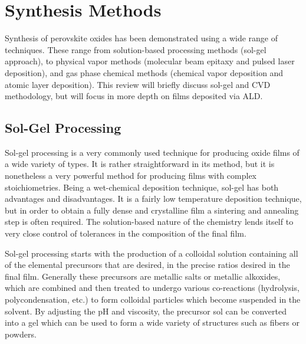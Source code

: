 \chapter{Synthesis Methods}
\label{chap:Synth}
\thispagestyle{empty}


Synthesis of perovskite oxides has been demonstrated using a wide range of techniques. These range from solution-based processing methods (sol-gel approach), to physical vapor methods (molecular beam epitaxy and pulsed laser deposition), and gas phase chemical methods (chemical vapor deposition and atomic layer deposition). This review will briefly discuss sol-gel and CVD methodology, but will focus in more depth on films deposited via ALD. 


\section{Sol-Gel Processing}
\label{sec:Synth-SolGel}

Sol-gel processing is a very commonly used technique for producing oxide films of a wide variety of types. It is rather straightforward in its method, but it is nonetheless a very powerful method for producing films with complex stoichiometries. Being a wet-chemical deposition technique, sol-gel has both advantages and disadvantages. It is a fairly low temperature deposition technique, but in order to obtain a fully dense and crystalline film a sintering and annealing step is often required. The solution-based nature of the chemistry lends itself to very close control of tolerances in the composition of the final film. 

Sol-gel processing starts with the production of a colloidal solution containing all of the elemental precursors that are desired, in the precise ratios desired in the final film. Generally these precursors are metallic salts or metallic alkoxides, which are combined and then treated to undergo various co-reactions (hydrolysis, polycondensation, etc.) to form colloidal particles which become suspended in the solvent. By adjusting the pH and viscosity, the precursor sol can be converted into a gel which can be used to form a wide variety of structures such as fibers or powders. 

